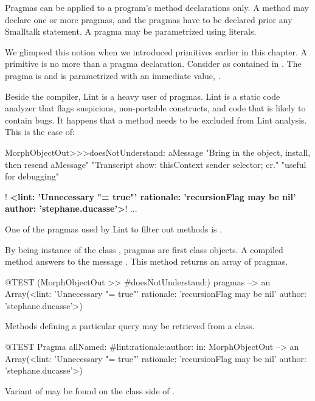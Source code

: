 \documentclass[a4paper,10pt,twoside]{book}
\begin{document}
Pragmas can be applied to a program's method declarations only. A method may declare one or more pragmas, and the pragmas have to be declared prior any Smalltalk statement. A pragma may be parametrized using literals. 

We glimpsed this notion when we introduced primitives earlier in this chapter. A primitive is no more than a pragma declaration. 
Consider  as contained in . The pragma  is  and is parametrized with an immediate  value, . 

Beside the compiler, Lint is a heavy user of pragmas. Lint is a static code analyzer that flags suspicious, non-portable constructs, and code that is likely to contain bugs. It happens that a method needs to be excluded from Lint analysis. This is the case of:

\begin{code}{}
MorphObjectOut>>>doesNotUnderstand: aMessage 
	"Bring in the object, install, then resend aMessage"
	"Transcript show: thisContext sender selector; cr."
	"useful for debugging"
	
	! \textbf{<lint: 'Unnecessary "= true"' rationale: 'recursionFlag may be nil' author: 'stephane.ducasse'>}!
	...
\end{code}	

One of the pragmas used by Lint to filter out methods is .

By being instance of the class , pragmas are first class objects. A compiled method answers to the message . This method returns an array of pragmas. 

\begin{code}{@TEST}
(MorphObjectOut >> #doesNotUnderstand:) pragmas                                            --> an Array(<lint: 'Unnecessary "= true"' rationale: 'recursionFlag may be nil' author: 'stephane.ducasse'>)
\end{code}

Methods defining a particular query may be retrieved from a class.

\begin{code}{@TEST}
Pragma allNamed: #lint:rationale:author: in: MorphObjectOut --> an Array(<lint: 'Unnecessary "= true"' rationale: 'recursionFlag may be nil' author: 'stephane.ducasse'>)
\end{code}

Variant of  may be found on the class side of .
\end{document}
